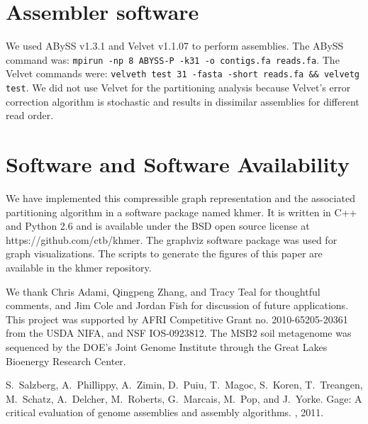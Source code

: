 \documentclass{pnastwo}
\begin{document}
\begin{article}
\begin{materials}
\section{Assembler software}

We used ABySS v1.3.1 and Velvet v1.1.07 to perform assemblies.
The ABySS command was: {\tt mpirun -np 8 ABYSS-P -k31 -o contigs.fa reads.fa}.
The Velvet commands were: {\tt velveth test 31 -fasta -short reads.fa \&\& velvetg test}.
We did not use Velvet for the partitioning analysis because Velvet's
error correction algorithm is stochastic and results in dissimilar
assemblies for different read order.

\section{Software and Software Availability}

We have implemented this compressible graph representation and the associated
partitioning algorithm in a
software package named khmer.  It is written in C++ and Python 2.6 and
is available under the BSD open source license at
https://github.com/ctb/khmer.  The graphviz software package was used
for graph visualizations. The scripts to generate the figures of this
paper are available in the khmer repository.

\end{materials}

\begin{acknowledgments}

We thank Chris Adami, Qingpeng Zhang, and Tracy Teal for
thoughtful comments, and Jim Cole and Jordan Fish for discussion of future
applications.  This project was supported by AFRI Competitive Grant
no. 2010-65205-20361 from the USDA NIFA, and NSF IOS-0923812.  The
MSB2 soil metagenome was sequenced by the DOE's Joint Genome
Institute through the Great Lakes Bioenergy Research Center.

\end{acknowledgments}




%

\begin{thebibliography}{10}

S.~Salzberg, A.~Phillippy, A.~Zimin, D.~Puiu, T.~Magoc, S.~Koren, T.~Treangen,
  M.~Schatz, A.~Delcher, M.~Roberts, G.~Marcais, M.~Pop, and J.~Yorke.
\newblock Gage: A critical evaluation of genome assemblies and assembly
  algorithms.
, 2011.


\end{thebibliography}
\end{article}
\end{document}
